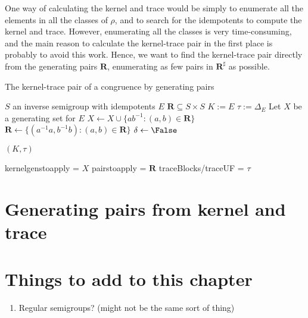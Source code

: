 One way of calculating the kernel and trace would be simply to enumerate all the
elements in all the classes of $\rho$, and to search for the idempotents to
compute the kernel and trace.  However, enumerating all the classes is very
time-consuming, and the main reason to calculate the kernel-trace pair in the
first place is probably to avoid this work.  Hence, we want to find the
kernel-trace pair directly from the generating pairs $\mathbf{R}$, enumerating
as few pairs in $\mathbf{R}^\sharp$ as possible.

\begin{algorithm}
\caption{The kernel-trace pair of a congruence by generating pairs}
\label{alg:pairs-to-kertr}
\begin{algorithmic}[1]
\Require $S$ an inverse semigroup with idempotents $E$
\Require $\mathbf{R} \subseteq S \times S$
\State $K := E$
\State $\tau := \Delta_E$
\State Let $X$ be a generating set for $E$
\State $X \gets X \cup \{ab^{-1} : (a,b) \in \mathbf{R}\}$
\State $\mathbf{R} \gets \{(a^{-1}a, b^{-1}b) : (a,b) \in \mathbf{R}\}$
\Repeat
\State $\delta \gets \False$ 
\State {}
\State {}
\State {}
\Until{$\delta = \False$} 

\State \Return $(K, \tau)$
\EndProcedure


\EndProcedure
\end{algorithmic}
\end{algorithm}

kernelgenstoapply = $X$
pairstoapply = $\mathbf{R}$
traceBlocks/traceUF = $\tau$

\section{Generating pairs from kernel and trace}
\label{sec:kertr-to-pairs}

\section{Things to add to this chapter}
\begin{enumerate}
\item Regular semigroups? (might not be the same sort of thing)
\end{enumerate}
